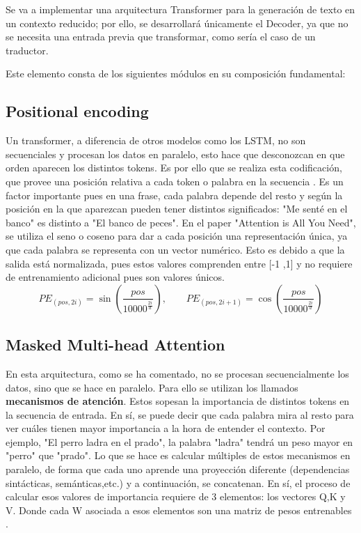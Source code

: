 \documentclass[11pt]{book}
\theoremstyle{plain}
\theoremstyle{definition}
\begin{document}
Se va a implementar una arquitectura Transformer para la generación de texto en un contexto reducido; por ello, se desarrollará únicamente el Decoder, ya que no se necesita una entrada previa que transformar, como sería el caso de un traductor.


Este elemento consta de los siguientes módulos en su composición fundamental:
\subsection{Positional encoding}
Un transformer, a diferencia de otros modelos como los LSTM, no son secuenciales y procesan los datos en paralelo, esto hace que desconozcan en que orden aparecen los distintos tokens. Es por ello que se realiza esta codificación, que provee una posición relativa a cada token o palabra en la secuencia \parencite{phillips2019positional}. Es un factor importante pues en una frase, cada palabra depende del resto y según la posición en la que aparezcan pueden tener distintos significados: "Me senté en el banco" es distinto a "El banco de peces". En el paper "Attention is All You Need", se utiliza el seno o coseno para dar a cada posición una representación única, ya que cada palabra se representa con un vector numérico. Esto es debido a que la salida está normalizada, pues estos valores comprenden entre [-1 ,1] y no requiere de entrenamiento adicional pues son valores únicos. 
    \[
    PE_{(pos, 2i)} = \sin\!\left(\frac{pos}{10000^{\tfrac{2i}{d}}}\right), 
    \qquad
    PE_{(pos, 2i+1)} = \cos\!\left(\frac{pos}{10000^{\tfrac{2i}{d}}}\right)
    \]
\subsection{Masked Multi-head Attention}\label{subsec:multihead}
En esta arquitectura, como se ha comentado, no se procesan secuencialmente los datos, sino que se hace en paralelo. Para ello se utilizan los llamados \textbf{mecanismos de atención}. Estos sopesan la importancia de distintos tokens en la secuencia de entrada. En sí, se puede decir que cada palabra mira al resto para ver cuáles tienen mayor importancia a la hora de entender el contexto. Por ejemplo, "El perro ladra en el prado", la palabra "ladra" tendrá un peso mayor en "perro" que "prado". Lo que se hace es calcular múltiples de estos mecanismos en paralelo, de forma que cada uno aprende una proyección diferente (dependencias sintácticas, semánticas,etc.) y a continuación, se concatenan. 
En sí, el proceso de calcular esos valores de importancia requiere de 3 elementos: los vectores Q,K y V. Donde cada W asociada a esos elementos son una matriz de pesos entrenables \parencite{analytics2020qkv}.
\end{document}
